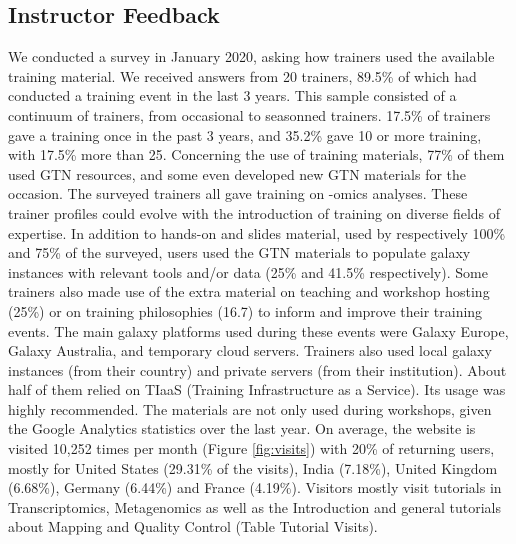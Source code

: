 \documentclass[10pt,letterpaper]{article}
\begin{document}
\subsection*{Instructor Feedback}

We conducted a survey in January 2020, asking how trainers used the available training material. We received answers from 20 trainers, 89.5\% of which had conducted a training event in the last 3 years.
This sample consisted of a continuum of trainers, from occasional to seasonned trainers. 17.5\% of trainers gave a training once in the past 3 years, and 35.2\% gave 10 or more training, with 17.5\% more than 25.
Concerning the use of training materials, 77\% of them used GTN resources, and some even developed new GTN materials for the occasion. The surveyed trainers all gave training on -omics analyses.
These trainer profiles could evolve with the introduction of training on diverse fields of expertise. In addition to hands-on and slides material, used by respectively 100\% and 75\% of the surveyed, users used the GTN materials to populate galaxy instances with relevant tools and/or data (25\% and 41.5\% respectively).
Some trainers also made use of the extra material on teaching and workshop hosting (25\%) or on training philosophies (16.7) to inform and improve their training events.
The main galaxy platforms used during these events were Galaxy Europe, Galaxy  Australia, and temporary cloud servers. Trainers also used local galaxy instances (from their country) and  private servers (from their institution).
About half of them relied on TIaaS (Training Infrastructure as a Service). Its usage was highly recommended.
The materials are not only used during workshops, given the Google Analytics statistics over the last year.
On average, the website is visited 10,252 times per month (Figure \ref{fig:visits}) with 20\% of returning users, mostly for United States (29.31\% of the visits), India (7.18\%), United Kingdom (6.68\%), Germany (6.44\%) and France (4.19\%). Visitors mostly visit tutorials in Transcriptomics, Metagenomics as well as the Introduction and general tutorials about Mapping and Quality Control (Table Tutorial Visits).
\end{document}
